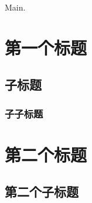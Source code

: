 \documentclass{article}
\begin{document}
Main.

\section{第一个标题}

\subsection{子标题}

\subsubsection{子子标题}

\section{第二个标题}

\subsection{第二个子标题}
\end{document}
